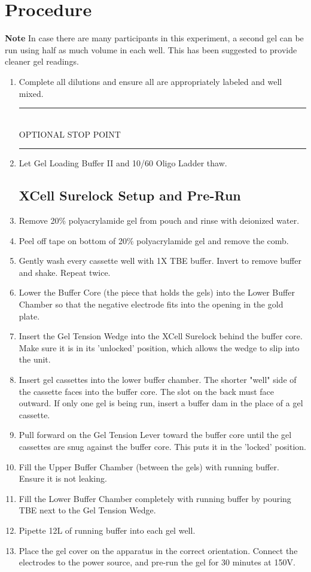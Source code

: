 \documentclass[letterpaper]{article}
\newcommand{\uL}{\micro{}L}
\newcommand{\stopPoint}{\begin{center}
\rule{0.5\textwidth}{.4pt}\\
\vspace{1mm} 
OPTIONAL STOP POINT\\
\rule{0.5\textwidth}{.4pt}
\end{center}}
\begin{document}
\section{Procedure}%
\textbf{Note} In case there are many participants in this experiment, a second gel can be run using half as much volume in each well. This has been suggested to provide cleaner gel readings.
\begin{enumerate} 
\subsection{Sample Preparation}
\item{Complete all dilutions and ensure all are appropriately labeled and well mixed.}
\stopPoint{} 
\item{Let Gel Loading Buffer II and 10/60 Oligo Ladder thaw.}
\subsection{XCell Surelock Setup and Pre-Run}
\item{Remove 20\% polyacrylamide gel from pouch and rinse with deionized water.}
\item{Peel off tape on bottom of 20\% polyacrylamide gel and remove the comb.}
\item{Gently wash every cassette well with 1X TBE buffer. Invert to remove buffer and shake. Repeat twice.}
\item{Lower the Buffer Core (the piece that holds the gels) into the Lower Buffer Chamber so that the negative electrode fits into the opening in the gold plate.}
\item{Insert the Gel Tension Wedge into the XCell Surelock behind the buffer core. Make sure it is in its 'unlocked' position, which allows the wedge to slip into the unit.}
\item{Insert gel cassettes into the lower buffer chamber. The shorter "well" side of the cassette faces into the buffer core. The slot on the back must face outward. If only one gel is being run, insert a buffer dam in the place of a gel cassette.}
\item{Pull forward on the Gel Tension Lever toward the buffer core until the gel cassettes are snug against the buffer core. This puts it in the 'locked' position.}
\item{Fill the Upper Buffer Chamber (between the gels) with running buffer. Ensure it is not leaking.}
\item{Fill the Lower Buffer Chamber completely with running buffer by pouring TBE next to the Gel Tension Wedge.}
\item{Pipette 12\uL{} of running buffer into each gel well.}
\item{Place the gel cover on the apparatus in the correct orientation. Connect the electrodes to the power source, and pre-run the gel for 30 minutes at 150V.}



\end{enumerate}
\end{document}
